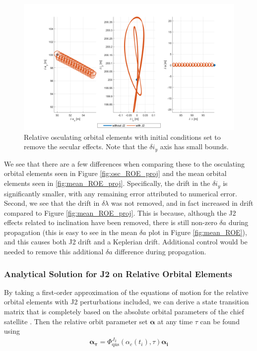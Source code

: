 \begin{figure}[H]
    \centering
    \includegraphics[width=0.8\linewidth]{sim/figures/PS4/ROE_projections_osc_no_drift_SV2.png}
    \caption{Relative osculating orbital elements with initial conditions set to remove the secular effects. Note that the $\delta i_y$ axis has small bounds.}
    \label{fig:rel_roe_no_drift_osc}
\end{figure}

We see that there are a few differences when comparing these to the osculating orbital elements seen in Figure \ref{fig:osc_ROE_proj} and the mean orbital elements seen in \ref{fig:mean_ROE_proj}. Specifically, the drift in the $\delta i_y$ is significantly smaller, with any remaining error attributed to numerical error. Second, we see that the drift in $\delta \lambda$ was not removed, and in fact increased in drift compared to Figure \ref{fig:mean_ROE_proj}. This is because, although the J2 effects related to inclination have been removed, there is still non-zero $\delta a$ during propagation (this is easy to see in the mean $\delta a$ plot in Figure \ref{fig:mean_ROE}), and this causes both J2 drift and a Keplerian drift. Additional control would be needed to remove this additional $\delta a$ difference during propagation.

\subsubsection{Analytical Solution for J2 on Relative Orbital Elements} \label{sec:j2_analytical_roe}

By taking a first-order approximation of the equations of motion for the relative orbital elements with J2 perturbations included, we can derive a state transition matrix that is completely based on the absolute orbital parameters of the chief satellite \cite{koenig2017new}. Then the relative orbit parameter set $\boldsymbol{\alpha}$ at any time $\tau$ can be found using
\begin{align}
    \boldsymbol{\alpha_{\tau}} = \Phi^{J_2}_{\text{qns}}(\alpha_c(t_i), \tau) \boldsymbol{\alpha_{i}}
\end{align}

